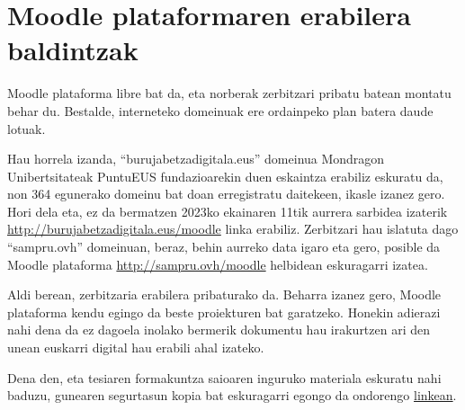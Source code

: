 \section{Moodle plataformaren erabilera baldintzak}\label{eranskin:moodle}
Moodle plataforma libre bat da, eta norberak zerbitzari pribatu batean montatu behar du. Bestalde, interneteko domeinuak ere ordainpeko plan batera daude lotuak.

Hau horrela izanda, “burujabetzadigitala.eus” domeinua Mondragon Unibertsitateak PuntuEUS fundazioarekin duen eskaintza erabiliz eskuratu da, non 364 egunerako domeinu bat doan erregistratu daitekeen, ikasle izanez gero. Hori dela eta, ez da bermatzen 2023ko ekainaren 11tik aurrera sarbidea izaterik \url{http://burujabetzadigitala.eus/moodle} linka erabiliz. Zerbitzari hau islatuta dago “sampru.ovh” domeinuan, beraz, behin aurreko data igaro eta gero, posible da Moodle plataforma \url{http://sampru.ovh/moodle} helbidean eskuragarri izatea.

Aldi berean, zerbitzaria erabilera pribaturako da. Beharra izanez gero, Moodle plataforma kendu egingo da beste proiekturen bat garatzeko. Honekin adierazi nahi dena da ez dagoela inolako bermerik dokumentu hau irakurtzen ari den unean euskarri digital hau erabili ahal izateko.

Dena den, eta tesiaren formakuntza saioaren inguruko materiala eskuratu nahi baduzu, gunearen segurtasun kopia bat eskuragarri egongo da ondorengo \href{https://drive.google.com/drive/folders/1S8kl20k8nW0w-bopBuNT5HyozOxtO4Ei?usp=sharing}{linkean}.
